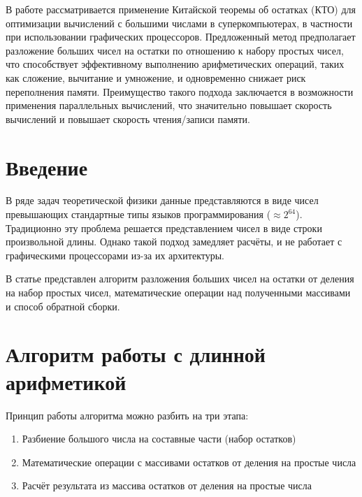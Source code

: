 \documentclass[10pt]{article}
\begin{document}
\makeface



\abstract В работе рассматривается применение Китайской теоремы об остатках (КТО) для оптимизации вычислений с большими числами в суперкомпьютерах, в частности при использовании графических процессоров. Предложенный метод предполагает разложение больших чисел на остатки по отношению к набору простых чисел, что способствует эффективному выполнению арифметических операций, таких как сложение, вычитание и умножение, и одновременно снижает риск переполнения памяти. Преимущество такого подхода заключается в возможности применения параллельных вычислений, что значительно повышает скорость вычислений и повышает скорость чтения/записи памяти.



\section*{Введение}

В ряде задач теоретической физики \cite{hao2022cambricon, makarova2023canonical, trukhin2024thermodynamic, trukhin2025low} данные представляются в виде чисел превышающих стандартные типы языков программирования ($\approx 2^{64}$). Традиционно эту проблема решается представлением чисел в виде строки произвольной длины. Однако такой подход замедляет расчёты, и не работает с графическими процессорами из-за их архитектуры.

В статье представлен алгоритм разложения больших чисел на остатки от деления на набор простых чисел, математические операции над полученными массивами и способ обратной сборки.

\section{Алгоритм работы с длинной арифметикой} 

Принцип работы алгоритма можно разбить на три этапа: 

\begin{enumerate}
	\item Разбиение большого числа на составные части (набор остатков)
	\item Математические операции с массивами остатков от деления на простые числа
	\item Расчёт результата из массива остатков от деления на простые числа
\end{enumerate}
\end{document}
